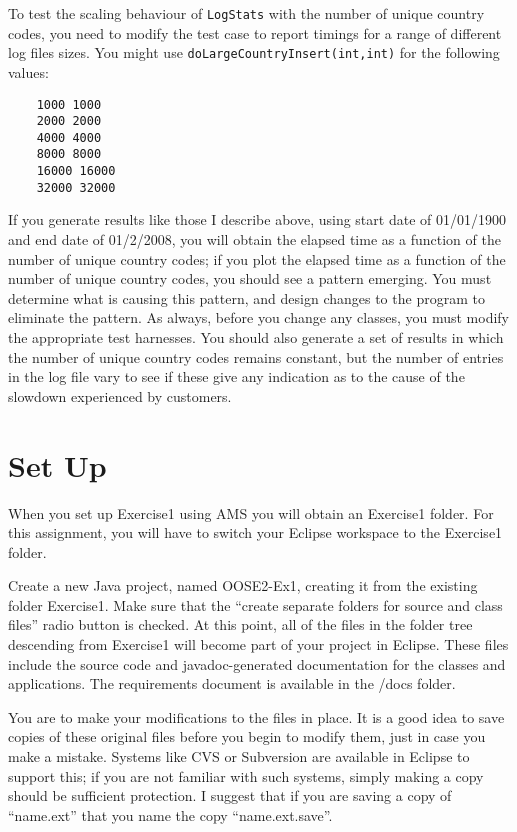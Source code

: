 \documentclass[12pt,a4paper]{article}
\begin{document}
\begin{enumerate}
  To test the scaling behaviour of \lstinline!LogStats! with the
  number of unique country codes, you need to modify the test case to
  report timings for a range of different log files sizes.  You might
  use \lstinline!doLargeCountryInsert(int,int)! for the following
  values:

  \begin{lstlisting}
    1000 1000
    2000 2000
    4000 4000
    8000 8000
    16000 16000
    32000 32000    
  \end{lstlisting}

  If you generate results like those I describe above, using start
  date of 01/01/1900 and end date of 01/2/2008, you will obtain the
  elapsed time as a function of the number of unique country codes; if
  you plot the elapsed time as a function of the number of unique
  country codes, you should see a pattern emerging.  You must
  determine what is causing this pattern, and design changes to the
  program to eliminate the pattern.  As always, before you change any
  classes, you must modify the appropriate test harnesses.  You should
  also generate a set of results in which the number of unique country
  codes remains constant, but the number of entries in the log file
  vary to see if these give any indication as to the cause of the
  slowdown experienced by customers.
 \end{enumerate}

\section{Set Up}

When you set up Exercise1 using AMS you will obtain an Exercise1
folder.  For this assignment, you will have to switch your Eclipse
workspace to the Exercise1 folder.

Create a new Java project, named OOSE2-Ex1, creating it from the
existing folder Exercise1.  Make sure that the ``create separate
folders for source and class files'' radio button is checked.  At this
point, all of the files in the folder tree descending from Exercise1
will become part of your project in Eclipse.  These files include the
source code and javadoc-generated documentation for the classes and
applications.  The requirements document is available in the /docs
folder.

You are to make your modifications to the files in place.  It is a
good idea to save copies of these original files before you begin to
modify them, just in case you make a mistake.  Systems like CVS or
Subversion are available in Eclipse to support this; if you are not
familiar with such systems, simply making a copy should be sufficient
protection.  I suggest that if you are saving a copy of ``name.ext''
that you name the copy ``name.ext.save''.
\end{document}
